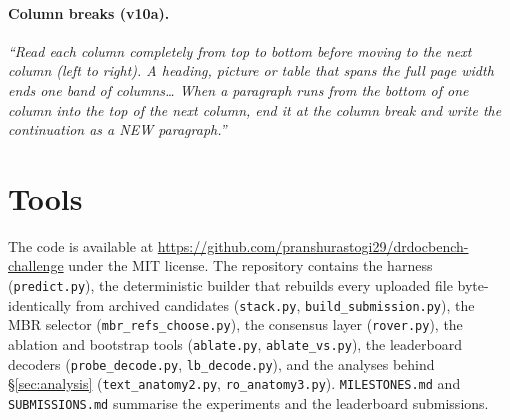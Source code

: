 \documentclass[11pt]{article}
\begin{document}
\paragraph{Column breaks (v10a).} \emph{``Read each column completely from top to bottom before moving to the next column (left to right). A heading, picture or table that spans the full page width ends one band of columns\ldots{} When a paragraph runs from the bottom of one column into the top of the next column, end it at the column break and write the continuation as a NEW paragraph.''}

\section{Tools}
\label{app:tools}
The code is available at \url{https://github.com/pranshurastogi29/drdocbench-challenge} under the MIT license. The repository contains the harness (\texttt{predict.py}), the deterministic builder that rebuilds every uploaded file byte-identically from archived candidates (\texttt{stack.py}, \texttt{build\_submission.py}), the MBR selector (\texttt{mbr\_refs\_choose.py}), the consensus layer (\texttt{rover.py}), the ablation and bootstrap tools (\texttt{ablate.py}, \texttt{ablate\_vs.py}), the leaderboard decoders (\texttt{probe\_decode.py}, \texttt{lb\_decode.py}), and the analyses behind \S\ref{sec:analysis} (\texttt{text\_anatomy2.py}, \texttt{ro\_anatomy3.py}). \texttt{MILESTONES.md} and \texttt{SUBMISSIONS.md} summarise the experiments and the leaderboard submissions.
\end{document}

